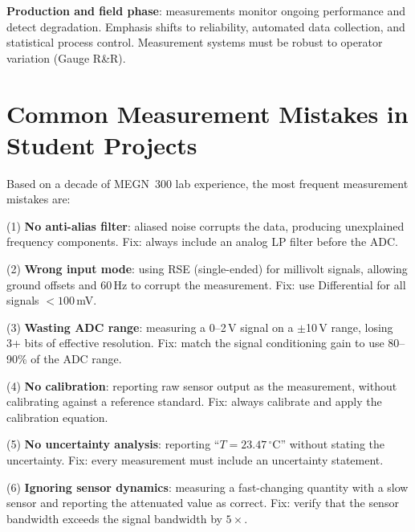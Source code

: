 \documentclass[11pt,letterpaper,twoside,openany]{book}
\newcommand{\degC}{\ensuremath{{}^{\circ}\text{C}}}
\begin{document}
\textbf{Production and field phase}: measurements monitor ongoing performance and detect degradation. Emphasis shifts to reliability, automated data collection, and statistical process control. Measurement systems must be robust to operator variation (Gauge R\&R).

\section{Common Measurement Mistakes in Student Projects}
Based on a decade of MEGN~300 lab experience, the most frequent measurement mistakes are:

(1) \textbf{No anti-alias filter}: aliased noise corrupts the data, producing unexplained frequency components. Fix: always include an analog LP filter before the ADC.

(2) \textbf{Wrong input mode}: using RSE (single-ended) for millivolt signals, allowing ground offsets and 60\,Hz to corrupt the measurement. Fix: use Differential for all signals $< 100$\,mV.

(3) \textbf{Wasting ADC range}: measuring a 0--2\,V signal on a $\pm$10\,V range, losing 3+ bits of effective resolution. Fix: match the signal conditioning gain to use 80--90\% of the ADC range.

(4) \textbf{No calibration}: reporting raw sensor output as the measurement, without calibrating against a reference standard. Fix: always calibrate and apply the calibration equation.

(5) \textbf{No uncertainty analysis}: reporting ``$T = 23.47$\,\degC{}'' without stating the uncertainty. Fix: every measurement must include an uncertainty statement.

(6) \textbf{Ignoring sensor dynamics}: measuring a fast-changing quantity with a slow sensor and reporting the attenuated value as correct. Fix: verify that the sensor bandwidth exceeds the signal bandwidth by $5\times$.
\end{document}
